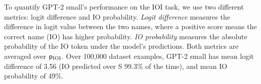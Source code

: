 

To quantify GPT-2 small's performance on the IOI task, we use two different metrics: logit difference and IO probability. \emph{Logit difference} measures the difference in logit value between the two names, where a positive score means the correct name (IO) has higher probability. \emph{IO probability} measures the absolute probability of the IO token under the model's predictions. Both metrics are averaged over $\mathsf{p}_{\mathrm{IOI}}$. Over 100,000 dataset examples, GPT-2 small has mean logit difference of 3.56 (IO predicted over S 99.3\% of the time), and mean IO probability of 49\%. %

